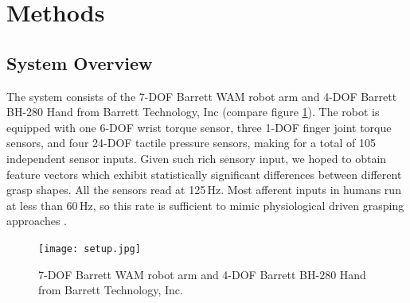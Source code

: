 \renewcommand{\thesection}{\Roman{section}}
\section{Methods}

\subsection*{System Overview}

\quad The system consists of the 7-DOF Barrett WAM robot arm and 4-DOF Barrett BH-280 Hand from Barrett Technology, Inc (compare figure \ref{setup}). The robot is equipped with one 6-DOF wrist torque sensor, three 1-DOF finger joint torque sensors, and four 24-DOF tactile pressure sensors, making for a total of 105 independent sensor inputs. Given such rich sensory input, we hoped to obtain feature vectors which exhibit statistically significant differences between different grasp shapes. All the sensors read at 125\,Hz. Most afferent inputs in humans run at less than 60\,Hz, so this rate is sufficient to mimic physiological driven grasping approaches \cite{Howe}.

\begin{figure}[H]
	\centering
	\texttt{[image: setup.jpg]}	
	\caption{7-DOF Barrett WAM robot arm and 4-DOF Barrett BH-280 Hand from Barrett Technology, Inc.}
	\label{setup}
\end{figure}

